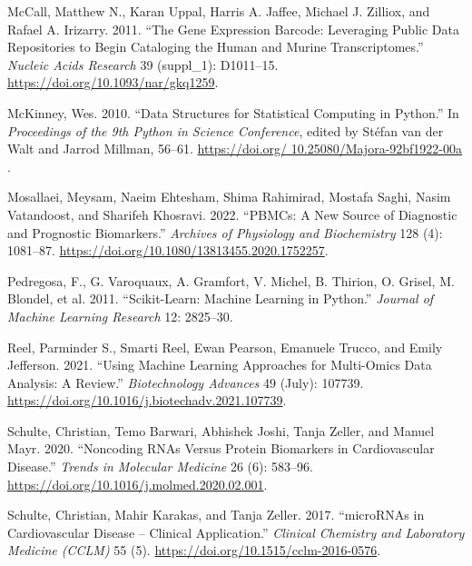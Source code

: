 \documentclass[smallextended]{svjour3}       %
\newlength{\cslhangindent}
\newlength{\cslentryspacingunit} %
\newenvironment{CSLReferences}[2] %
 {%
  \setlength{\parindent}{0pt}
  \ifodd #1
  \let\oldpar\par
  \def\par{\hangindent=\cslhangindent\oldpar}
  \fi
  \setlength{\parskip}{#2\cslentryspacingunit}
 }%
 {}
\begin{document}
\begin{CSLReferences}{1}{0}
\leavevmode{}%
McCall, Matthew N., Karan Uppal, Harris A. Jaffee, Michael J. Zilliox,
and Rafael A. Irizarry. 2011. {``The {Gene} {Expression} {Barcode}:
Leveraging Public Data Repositories to Begin Cataloging the Human and
Murine Transcriptomes.''} \emph{Nucleic Acids Research} 39 (suppl\_1):
D1011--15. \url{https://doi.org/10.1093/nar/gkq1259}.

\leavevmode{}%
McKinney, Wes. 2010. {``{D}ata {S}tructures for {S}tatistical
{C}omputing in {P}ython.''} In \emph{{P}roceedings of the 9th {P}ython
in {S}cience {C}onference}, edited by Stéfan van der Walt and Jarrod
Millman, 56--61.
\href{https://doi.org/\%2010.25080/Majora-92bf1922-00a\%20}{https://doi.org/
10.25080/Majora-92bf1922-00a }.

\leavevmode{}%
Mosallaei, Meysam, Naeim Ehtesham, Shima Rahimirad, Mostafa Saghi, Nasim
Vatandoost, and Sharifeh Khosravi. 2022. {``{PBMCs}: A New Source of
Diagnostic and Prognostic Biomarkers.''} \emph{Archives of Physiology
and Biochemistry} 128 (4): 1081--87.
\url{https://doi.org/10.1080/13813455.2020.1752257}.

\leavevmode{}%
Pedregosa, F., G. Varoquaux, A. Gramfort, V. Michel, B. Thirion, O.
Grisel, M. Blondel, et al. 2011. {``Scikit-Learn: Machine Learning in
{P}ython.''} \emph{Journal of Machine Learning Research} 12: 2825--30.

\leavevmode{}%
Reel, Parminder S., Smarti Reel, Ewan Pearson, Emanuele Trucco, and
Emily Jefferson. 2021. {``Using Machine Learning Approaches for
Multi-Omics Data Analysis: {A} Review.''} \emph{Biotechnology Advances}
49 (July): 107739.
\url{https://doi.org/10.1016/j.biotechadv.2021.107739}.

\leavevmode{}%
Schulte, Christian, Temo Barwari, Abhishek Joshi, Tanja Zeller, and
Manuel Mayr. 2020. {``Noncoding {RNAs} Versus {Protein} {Biomarkers} in
{Cardiovascular} {Disease}.''} \emph{Trends in Molecular Medicine} 26
(6): 583--96. \url{https://doi.org/10.1016/j.molmed.2020.02.001}.

\leavevmode{}%
Schulte, Christian, Mahir Karakas, and Tanja Zeller. 2017.
{``{microRNAs} in Cardiovascular Disease -- Clinical Application.''}
\emph{Clinical Chemistry and Laboratory Medicine (CCLM)} 55 (5).
\url{https://doi.org/10.1515/cclm-2016-0576}.


\end{CSLReferences}
\end{document}
